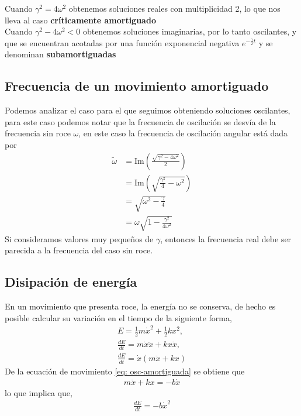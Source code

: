 \documentclass[12pt]{article}
\begin{document}
Cuando \(\gamma^{2} = 4\omega^{2}\) obtenemos soluciones reales con multiplicidad 2, lo que nos lleva al caso \textbf{críticamente amortiguado}\\

Cuando \(\gamma^{2} - 4\omega^{2} < 0\) obtenemos soluciones imaginarias, por lo tanto oscilantes, y que se encuentran acotadas por una función exponencial negativa \(e^{-\frac{\gamma}{2}t}\) y se denominan \textbf{subamortiguadas}

\subsection{Frecuencia de un movimiento amortiguado}
Podemos analizar el caso para el que seguimos obteniendo soluciones oscilantes, para este caso podemos notar que la frecuencia de oscilación se desvía de la frecuencia sin roce \(\omega\), en este caso la frecuencia de oscilación angular está dada por 
\begin{align*}
    \tilde{\omega} &= \text{Im} \left(\frac{ \sqrt{\gamma^{2} - 4 \omega^{2}}}{2} \right)\\
    &= \text{Im}\left(\sqrt{\frac{\gamma^{2}}{4}- \omega^{2}} \right) \\
    &= \sqrt{\omega^{2} - \frac{\gamma}{4}}\\
    &= \omega \sqrt{ 1- \frac{\gamma^{2}}{4\omega^{2}}}
\end{align*}
Si consideramos valores muy pequeños de \(\gamma\), entonces la frecuencia real debe ser parecida a la frecuencia del caso sin roce.

\subsection{Disipación de energía}
En un movimiento que presenta roce, la energía no se conserva, de hecho es posible calcular su variación en el tiempo de la siguiente forma, 
\begin{align*}
    E = \frac{1}{2}m\dot{x}^{2} + \frac{1}{2}kx^{2}, \\
    \frac{dE}{dt} = m\dot{x}\ddot{x} + kx\dot{x}, \\
    \frac{dE}{dt} = \dot{x}(m\ddot{x} + k x)
\end{align*}
De la ecuación de movimiento \eqref{eq: osc-amortiguada} se obtiene que 
\begin{align*}
    m\ddot{x} + kx = -b\dot{x}
\end{align*}
lo que implica que, 
\begin{align*}
    \frac{dE}{dt} = -b\dot{x}^{2}
\end{align*}
\end{document}
